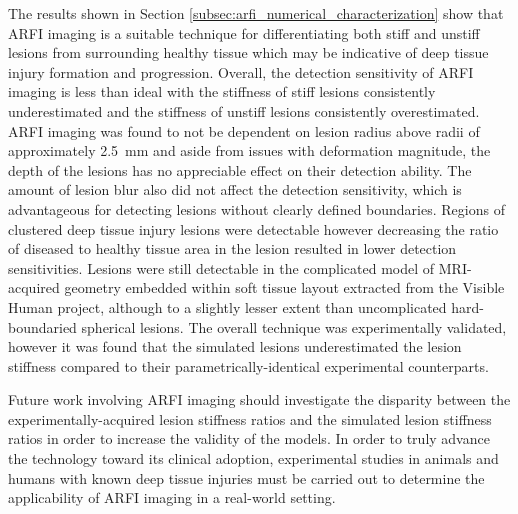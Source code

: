 		The results shown in Section \ref{subsec:arfi_numerical_characterization} show that ARFI imaging is a suitable technique for differentiating both stiff and unstiff lesions from surrounding healthy tissue which may be indicative of deep tissue injury formation and progression. Overall, the detection sensitivity of ARFI imaging is less than ideal with the stiffness of stiff lesions consistently underestimated and the stiffness of unstiff lesions consistently overestimated. ARFI imaging was found to not be dependent on lesion radius above radii of approximately \SI{2.5}{\mm} and aside from issues with deformation magnitude, the depth of the lesions has no appreciable effect on their detection ability. The amount of lesion blur also did not affect the detection sensitivity, which is advantageous for detecting lesions without clearly defined boundaries. Regions of clustered deep tissue injury lesions were detectable however decreasing the ratio of diseased to healthy tissue area in the lesion resulted in lower detection sensitivities. Lesions were still detectable in the complicated model of MRI-acquired geometry embedded within soft tissue layout extracted from the Visible Human project, although to a slightly lesser extent than uncomplicated hard-boundaried spherical lesions. The overall technique was experimentally validated, however it was found that the simulated lesions underestimated the lesion stiffness compared to their parametrically-identical experimental counterparts.

		Future work involving ARFI imaging should investigate the disparity between the experimentally-acquired lesion stiffness ratios and the simulated lesion stiffness ratios in order to increase the validity of the models. In order to truly advance the technology toward its clinical adoption, experimental studies in animals and humans with known deep tissue injuries must be carried out to determine the applicability of ARFI imaging in a real-world setting.

